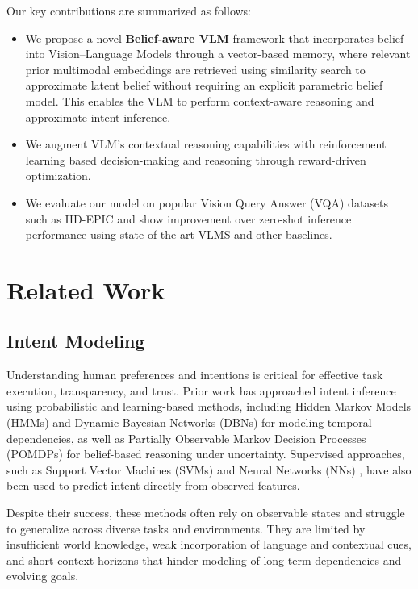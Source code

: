 \documentclass[letterpaper, 10 pt, conference]{ieeeconf}  %
\begin{document}
Our key contributions are summarized as follows:

\begin{itemize}

\item 
We propose a novel \textbf{Belief-aware VLM} framework that incorporates belief into Vision--Language Models through a vector-based memory, where relevant prior multimodal embeddings are retrieved using similarity search to approximate latent belief without requiring an explicit parametric belief model. This enables the VLM to perform context-aware reasoning and approximate intent inference.



\item We augment VLM's contextual reasoning capabilities with  reinforcement learning based decision-making and reasoning through reward-driven optimization.


\item We evaluate our model on popular Vision Query Answer (VQA) datasets such as HD-EPIC \cite{11094504} and show improvement over zero-shot inference performance using state-of-the-art VLMS and other baselines.   


\end{itemize}


\section{Related Work}

\subsection{Intent Modeling}

Understanding human preferences and intentions  is critical for effective task execution, transparency, and trust. Prior work has approached intent inference using probabilistic and learning-based methods, including Hidden Markov Models (HMMs) \cite{PETKOVIC2019182} and Dynamic Bayesian Networks (DBNs) \cite{xu2015optimo, hao2025joint} for modeling temporal dependencies, as well as Partially Observable Markov Decision Processes (POMDPs) \cite{zhao2022coordination, bai2015intention} for belief-based reasoning under uncertainty. Supervised approaches, such as Support Vector Machines (SVMs) \cite{kang2015human} and Neural Networks (NNs) \cite{hu2022augmented}, have also been used to predict intent directly from observed features.

Despite their success, these methods often rely on observable states and struggle to generalize across diverse tasks and environments. They are limited by insufficient world knowledge, weak incorporation of language and contextual cues, and short context horizons that hinder modeling of long-term dependencies and evolving goals. 
\end{document}
